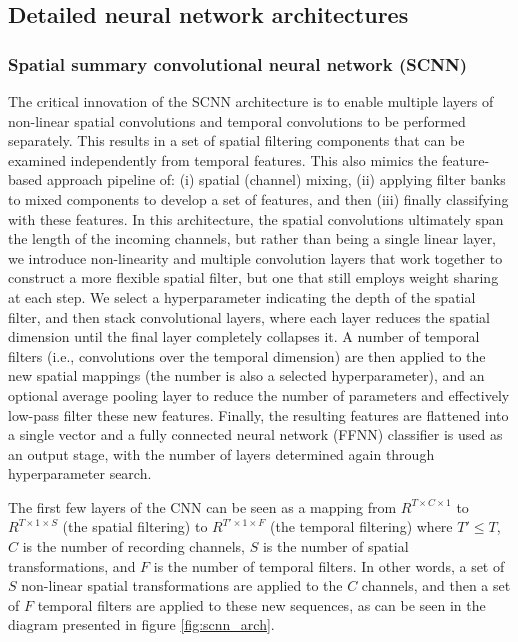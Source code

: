 \documentclass[fleqn,10pt]{wlscirep}
\begin{document}
\subsection*{Detailed neural network architectures}

\subsubsection*{Spatial summary convolutional neural network (SCNN)} \label{sec:scnn}

The critical innovation of the SCNN architecture is to enable multiple layers of non-linear spatial convolutions and temporal convolutions to be performed separately. This results in a set of spatial filtering components that can be examined independently from temporal features. This also mimics the feature-based approach pipeline of: (i) spatial (channel) mixing, (ii) applying filter banks to mixed components to develop a set of features, and then (iii) finally classifying with these features. In this architecture, the spatial convolutions ultimately span the length of the incoming channels, but rather than being a single linear layer, we introduce non-linearity and multiple convolution layers that work together to construct a more flexible spatial filter, but one that still employs weight sharing at each step. We select a hyperparameter indicating the depth of the spatial filter, and then stack convolutional layers, where each layer reduces the spatial dimension until the final layer completely collapses it. A number of temporal filters (i.e., convolutions over the temporal dimension) are then applied to the new spatial mappings (the number is also a selected hyperparameter), and an optional average pooling layer to reduce the number of parameters and effectively low-pass filter these new features. Finally, the resulting features are flattened into a single vector and a fully connected neural network (FFNN) classifier is used as an output stage, with the number of layers determined again through hyperparameter search.

The first few layers of the CNN can be seen as a mapping from $R^{T \times C \times 1}$ to $R^{T \times 1 \times S}$ (the spatial filtering) to $R^{T' \times 1 \times F }$ (the temporal filtering) where $T' \leq T$, $C$ is the number of recording channels, $S$ is the number of spatial transformations, and $F$ is the number of temporal filters. In other words, a set of $S$ non-linear spatial transformations are applied to the $C$ channels, and then a set of $F$ temporal filters are applied to these new sequences, as can be seen in the diagram presented in figure \ref{fig:scnn_arch}.
\end{document}
